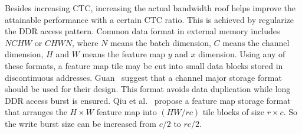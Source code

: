 Besides increasing CTC, increasing the actual bandwidth roof helps improve the attainable performance with a certain CTC ratio. This is achieved by regularize the DDR access pattern. Common data format in external memory includes $NCHW$ or $CHWN$, where $N$ means the batch dimension, $C$ means the channel dimension, $H$ and $W$ means the feature map $y$ and $x$ dimension. Using any of these formats, a feature map tile may be cut into small data blocks stored in discontinuous addresses. Guan~\cite{guan2017fp} suggest that a channel major storage format should be used for their design. This format avoids data duplication while long DDR access burst is ensured. Qiu et al.~\cite{qiu2016going} propose a feature map storage format that arranges the $H\times W$ feature map into $(HW/rc)$ tile blocks of size $r\times c$. So the write burst size can be increased from $c/2$ to $rc/2$.

